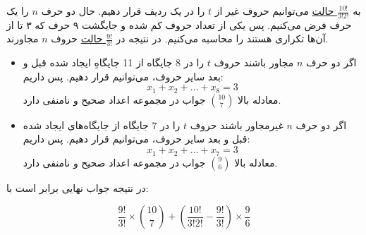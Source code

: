 \p
به
\underline{$\frac{10!}{3!2!}$ حالت}
 می‌توانیم حروف غیر از 
$t$ را در یک ردیف قرار دهیم.
حال دو حرف
$n$ 
را یک حرف فرض می‌کنیم. پس یکی از تعداد حروف کم شده و جایگشت ۹ حرف که ۳ تا از آن‌ها تکراری هستند را 
محاسبه می‌کنیم.
در نتیجه در 
\underline{$\frac{9!}{3!}$ حالت} 
 حروف 
$n$ مجاورند.
\begin{itemize}
\item 
اگر دو حرف
 $n$ 
 مجاور باشند حروف 
 $t$
  را در 8 جایگاه‌ از 11 جایگاه‌ِ ایجاد شده قبل و بعد سایر حروف، می‌توانیم قرار دهیم. پس داریم:
$$x_1 + x_2 + \ldots + x_8 = 3$$
 معادله بالا 
 \underline{$\binom{10}{7}$}
جواب در مجموعه اعداد صحیح و نامنفی دارد.

\item 
اگر دو حرف
 $n$ 
 غیرمجاور باشند حروف
  $t$ را در 7 جایگاه‌ از جایگاه‌های ایجاد شده قبل و بعد سایر حروف، می‌توانیم قرار دهیم. پس داریم:
$$x_1 + x_2 + \ldots + x_7 = 3$$
 معادله بالا 
 \underline{$\binom{9}{6}$}
جواب در مجموعه اعداد صحیح و نامنفی دارد. 
\end{itemize}
در نتیجه جواب نهایی برابر است با:

$$\frac{9!}{3!}\times\binom{10}{7} + (\frac{10!}{3!2!} - \frac{9!}{3!})\times\frac{9}{6}$$